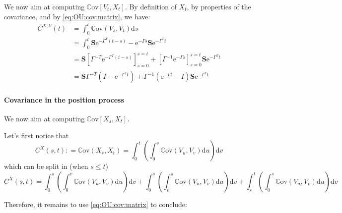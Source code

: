 \documentclass[10pt,a4paper]{article}
\newcommand{\rmd}{\text{d}}
\newcommand{\Cov}{\mathbb{C}\text{ov}}
\newcommand{\e}{\text{e}}
\newcommand{\inv}{^{-1}}
\newcommand{\Sinf}{\mathbf{S}}
\begin{document}
We now aim at computing $\Cov\left[V_t, X_t\right]$.
By definition of $X_t$, by properties of the covariance, and by \eqref{eq:OU:cov:matrix}, we have:
\begin{align*}
C^{X,V}(t) &= \int_0^t  \Cov(V_s, V_t) \rmd s\\
&=\int_0^t \Sinf\e^{-\Gamma^T (t - s)} -\e^{-\Gamma s}\Sinf \e^{-\Gamma^T t}\\
&= \Sinf\left[\Gamma^{-T}\e^{-\Gamma^T (t - s)} \right]_{s = 0}^{s = t} + \left[\Gamma^{-1}\e^{-\Gamma s} \right]_{s = 0}^{s = t} \Sinf  \e^{-\Gamma^T t}\\
&= \Sinf \Gamma^{-T}\left(I - \e^{-\Gamma^T t}\right) + \Gamma\inv\left(\e^{-\Gamma t} - I\right)\Sinf  \e^{-\Gamma^T t}
\end{align*}

\paragraph{Covariance in the position process}

We now aim at computing $\Cov\left[X_s, X_t\right]$.

Let's first notice that
$$C^X(s,t) : =  \Cov(X_s, X_t)  = \int_0^t \left( \int_0^s \Cov(V_u, V_v) \rmd u \right) \rmd v$$
which can be split in (when $s\leq t$)
$$C^X(s,t) = \int_0^s \left( \int_0^v \Cov(V_u, V_v) \rmd u \right) \rmd v + \int_0^s \left( \int_v^s \Cov(V_u, V_v) \rmd u \right) \rmd v + \int_s^t \left( \int_0^s \Cov(V_u, V_v) \rmd u \right) \rmd v$$

Therefore, it remains to use \eqref{eq:OU:cov:matrix} to conclude:
\end{document}
